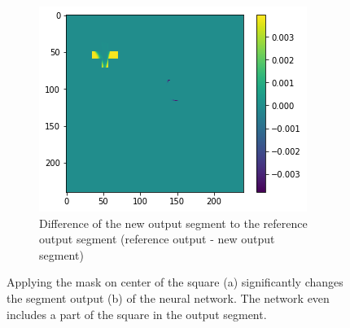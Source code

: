 \begin{figure}[H]
    \begin{subfigure}[t]{.33\textwidth}
        \centering
        \includegraphics[width=\linewidth]{chapters/06_hdm/images_analyze/0c_diff.png}
        \caption{Difference of the new output segment to the reference output segment (reference output - new output segment)}
    \end{subfigure}
    \caption{Applying the mask on center of the square (a) significantly changes the segment output (b) of the neural network. The network even includes a part of the square in the output segment.}
    \label{hdm_changed_output_2}
\end{figure}

